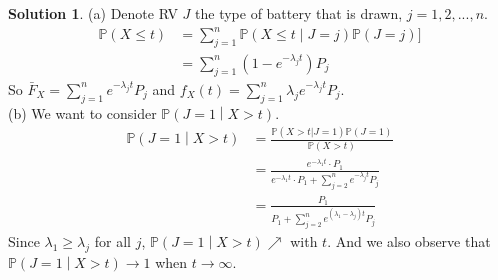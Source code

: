 \documentclass[a4paper, 10pt]{article}
\theoremstyle{definition}
\theoremstyle{hSol}
\newtheorem*{solution}{Solution}
\begin{document}
\begin{solution} (a) Denote RV $J$ the type of battery that is drawn, $j=1,2,...,n$.
\begin{equation}
  \begin{split}
    \mathbb{P}\left(X\leq t\right) &= \sum_{j=1}^n \mathbb{P}\left(X\leq t\middle|J=j\right)\mathbb{P}\left(J=j\right)]\\
    &= \sum_{j=1}^n (1-e^{-\lambda_j t}) P_j
  \end{split}
\end{equation}
So $\bar{F}_X=\sum_{j=1}^n e^{-\lambda_j t} P_j$ and $f_X(t)=\sum_{j=1}^n \lambda_j e^{-\lambda_j t} P_j$. \\
(b) We want to consider $\mathbb{P}\left(J=1\middle|X>t\right)$.
\begin{equation}
  \begin{split}
    \mathbb{P}\left(J=1\middle|X>t\right) &= \frac{\mathbb{P}\left(X>t|J=1\right)\mathbb{P}\left(J=1\right)}{\mathbb{P}\left(X>t\right)}\\
    &= \frac{e^{-\lambda_1 t}\cdot P_1}{e^{-\lambda_1 t}\cdot P_1+\sum_{j=2}^n e^{-\lambda_j t} P_j}\\
    &= \frac{P_1}{P_1+\sum_{j=2}^n e^{(\lambda_1-\lambda_j)t} P_j}
  \end{split}
\end{equation}
Since $\lambda_1 \geq \lambda_j$ for all $j$, $\mathbb{P}\left(J=1\middle|X>t\right) \nearrow $ with $t$. And we also observe that $\mathbb{P}\left(J=1\middle|X>t\right)\to 1$ when $t\to \infty$.
\end{solution}
\end{document}
